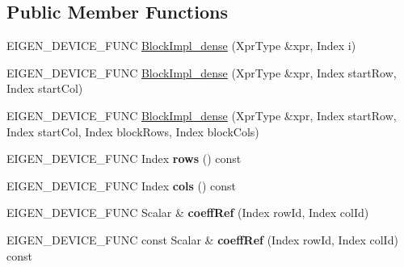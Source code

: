 \subsection*{Public Member Functions}
\begin{DoxyCompactItemize}
\item 
E\+I\+G\+E\+N\+\_\+\+D\+E\+V\+I\+C\+E\+\_\+\+F\+U\+NC \mbox{\hyperlink{class_eigen_1_1internal_1_1_block_impl__dense_af68c0eafb607bb884cfe507bee39052e}{Block\+Impl\+\_\+dense}} (Xpr\+Type \&xpr, Index i)
\item 
E\+I\+G\+E\+N\+\_\+\+D\+E\+V\+I\+C\+E\+\_\+\+F\+U\+NC \mbox{\hyperlink{class_eigen_1_1internal_1_1_block_impl__dense_aa77daae8d8aef85ce9445cfd23363cbf}{Block\+Impl\+\_\+dense}} (Xpr\+Type \&xpr, Index start\+Row, Index start\+Col)
\item 
E\+I\+G\+E\+N\+\_\+\+D\+E\+V\+I\+C\+E\+\_\+\+F\+U\+NC \mbox{\hyperlink{class_eigen_1_1internal_1_1_block_impl__dense_a187c7918e6f200bf1d7d9a9c2f608547}{Block\+Impl\+\_\+dense}} (Xpr\+Type \&xpr, Index start\+Row, Index start\+Col, Index block\+Rows, Index block\+Cols)
\item 
\mbox{\label{class_eigen_1_1internal_1_1_block_impl__dense_a233bff1b2ba038272ba57891802c9b30}} 
E\+I\+G\+E\+N\+\_\+\+D\+E\+V\+I\+C\+E\+\_\+\+F\+U\+NC Index {\bfseries rows} () const
\item 
\mbox{\label{class_eigen_1_1internal_1_1_block_impl__dense_ad9029a68d176acb67683ad387343a318}} 
E\+I\+G\+E\+N\+\_\+\+D\+E\+V\+I\+C\+E\+\_\+\+F\+U\+NC Index {\bfseries cols} () const
\item 
\mbox{\label{class_eigen_1_1internal_1_1_block_impl__dense_a1e50e8322ff5af7141c45eacbeaf86cd}} 
E\+I\+G\+E\+N\+\_\+\+D\+E\+V\+I\+C\+E\+\_\+\+F\+U\+NC Scalar \& {\bfseries coeff\+Ref} (Index row\+Id, Index col\+Id)
\item 
\mbox{\label{class_eigen_1_1internal_1_1_block_impl__dense_a8728f3d4165b1d602334a0a9c4ac74ae}} 
E\+I\+G\+E\+N\+\_\+\+D\+E\+V\+I\+C\+E\+\_\+\+F\+U\+NC const Scalar \& {\bfseries coeff\+Ref} (Index row\+Id, Index col\+Id) const
\item 
\mbox{\label{class_eigen_1_1internal_1_1_block_impl__dense_a6b865aa92f59769f560e1b67990d9199}} 

\end{DoxyCompactItemize}
